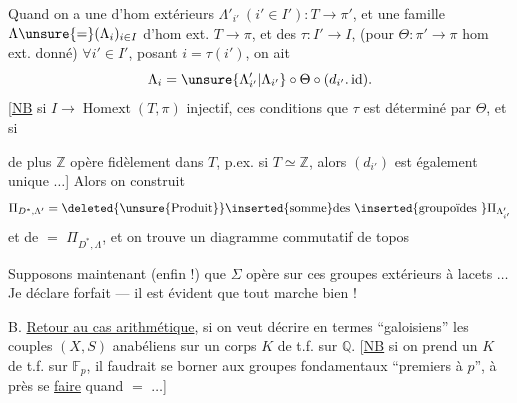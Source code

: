 Quand on a une   d'hom
extérieurs \(\Lambda'_{i'}\ (i'\in I'):T\longrightarrow\pi'\), et une
famille \(\Lambda\unsure{=}(\Lambda_i)_{i\in I}\) d'hom ext. \(T\longrightarrow\pi\), et des
\(\tau:I'\longrightarrow I\), 
(pour \(\Theta:\pi'\longrightarrow\pi\) hom ext. donné)
\(\forall i'\in I'\), posant \(i=\tau(i')\), on ait
\[
\Lambda_i=\unsure{\Lambda'_{i'}|\Lambda_{i'}}\circ\Theta\circ(d_{i'}.\operatorname{id}).
\]
[\uline{NB} si \(I\longrightarrow\operatorname{Homext}(T,\pi)\) injectif, ces conditions
 que \(\tau\) est déterminé par \(\Theta\), et si

de plus \(\mathbb Z\) opère fidèlement dans \(T\), p.ex.
si \(T\simeq\mathbb Z\), alors \((d_{i'})\) est également unique \(\ldots\)]
Alors on construit 
\[
\Pi_{D^*,\Lambda'}=
\deleted{\text{\unsure{Produit}}}\inserted{\text{somme}} \text{des }\inserted{\text{groupoïdes }}\Pi_{\Lambda'_{i'}}
\]
et de \(=\) \(\Pi_{D^*,\Lambda}\), et on trouve un
diagramme commutatif de topos

Supposons maintenant (enfin !) que
\(\Sigma\) opère sur ces groupes extérieurs à lacets \(\ldots\)
Je déclare forfait --- il est évident que
tout marche bien !

B. \uline{Retour au cas arithmétique}, si on
veut décrire en termes ``galoisiens'' les
couples \((X,S)\)  anabéliens  sur un corps
\(K\) de t.f. sur \(\mathbb Q\). [\uline{NB} si on prend
un \(K\) de t.f. sur \(\mathbb F_p\), il faudrait se
borner aux groupes fondamentaux ``premiers à
\(p\)'', à  près 
se \uline{faire} quand \(=\) \(\ldots\)]

